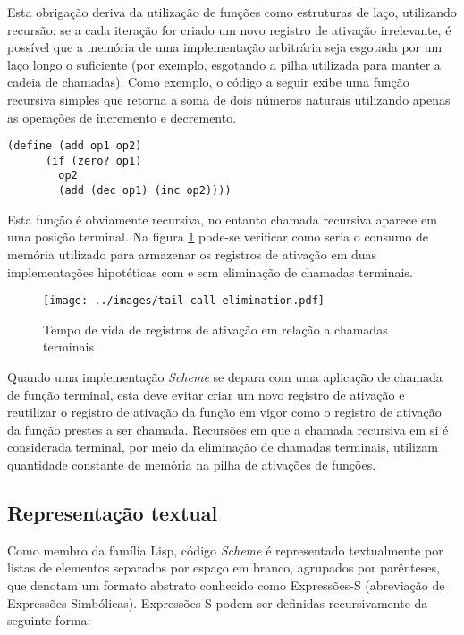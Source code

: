 Esta obrigação deriva da utilização de funções como estruturas de laço,
utilizando recursão: se a cada iteração for criado um novo registro de ativação
irrelevante, é possível que a memória de uma implementação arbitrária seja
esgotada por um laço longo o suficiente (por exemplo, esgotando a pilha
utilizada para manter a cadeia de chamadas). Como exemplo, o código a seguir
exibe uma função recursiva simples que retorna a soma de dois números naturais
utilizando apenas as operações de incremento e decremento.

\begin{lstlisting}[frame=none]
    (define (add op1 op2)
      (if (zero? op1)
        op2
        (add (dec op1) (inc op2))))
\end{lstlisting}

Esta função é obviamente recursiva, no entanto chamada recursiva aparece em uma
posição terminal. Na figura \ref{fig:tail-call-elimination} pode-se verificar
como seria o consumo de memória utilizado para armazenar os registros de
ativação em duas implementações hipotéticas com e sem eliminação de chamadas
terminais.

\begin{figure}[h!]
\centering
\texttt{[image: ../images/tail-call-elimination.pdf]}
\caption{Tempo de vida de registros de ativação em relação a chamadas terminais}
\label{fig:tail-call-elimination}
\end{figure}

Quando uma implementação \textit{Scheme} se depara com uma aplicação de chamada
de função terminal, esta deve evitar criar um novo registro de ativação e
reutilizar o registro de ativação da função em vigor como o registro de
ativação da função prestes a ser chamada. Recursões em que a chamada recursiva
em si é considerada terminal, por meio da eliminação de chamadas terminais,
utilizam quantidade constante de memória na pilha de ativações de funções.

\subsection{Representação textual}

Como membro da família Lisp, código
\textit{Scheme} é representado textualmente por listas de elementos separados
por espaço em branco, agrupados por parênteses, que denotam um formato abstrato
conhecido como Expressões-S (abreviação de Expressões Simbólicas). Expressões-S
podem ser definidas recursivamente da seguinte forma:

